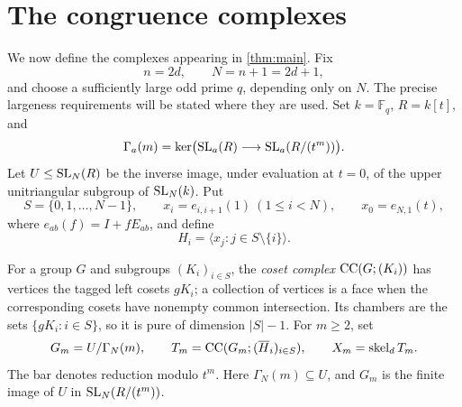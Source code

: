 \section{The congruence complexes}
\label{sec:construction}

We now define the complexes appearing in \cref{thm:main}. Fix
\[
 n=2d,\qquad N=n+1=2d+1,
\]
and choose a sufficiently large odd prime $q$, depending only on $N$.
The precise largeness requirements will be stated where they are used.
Set $k=\mathbb F_q$, $R=k[t]$, and
\[
 \Gamma_a(m)=\ker\bigl(\operatorname{SL}_a(R)\longrightarrow\operatorname{SL}_a(R/(t^m))\bigr).
\]
Let $U\le\operatorname{SL}_N(R)$ be the inverse image, under evaluation at $t=0$, of
the upper unitriangular subgroup of $\operatorname{SL}_N(k)$. Put
\[
 S=\{0,1,\ldots,N-1\},\qquad
 x_i=e_{i,i+1}(1)\ (1\le i<N),\qquad x_0=e_{N,1}(t),
\]
where $e_{ab}(f)=I+fE_{ab}$, and define
\begin{equation}\label{eq:Hi}
 H_i=\langle x_j:j\in S\setminus\{i\}\rangle.
\end{equation}

For a group $G$ and subgroups $(K_i)_{i\in S}$, the \emph{coset complex}
$\operatorname{CC}(G;(K_i))$ has vertices the tagged left cosets $gK_i$; a collection
of vertices is a face when the corresponding cosets have nonempty common
intersection. Its chambers are the sets $\{gK_i:i\in S\}$, so it is pure
of dimension $|S|-1$. For $m\ge2$, set
\begin{equation}\label{eq:construction}
 G_m=U/\Gamma_N(m),\qquad
 T_m=\operatorname{CC}(G_m;(\overline H_i)_{i\in S}),\qquad
 X_m=\operatorname{skel}_d T_m.
\end{equation}
The bar denotes reduction modulo $t^m$. Here $\Gamma_N(m)\subseteq U$,
and $G_m$ is the finite image of $U$ in $\operatorname{SL}_N(R/(t^m))$.

